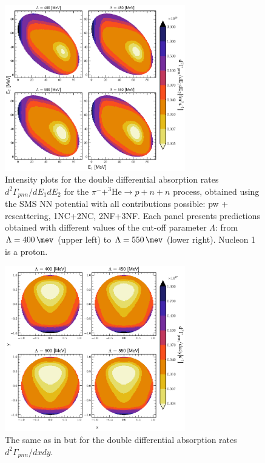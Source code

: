     
    
        \begin{figure}[h]
            \begin{center}
            \includegraphics[width=0.7\textwidth]{PlotData/PION/Dalitz_maps/figures/Dalitz_map_pnn_E1E2_cutofs.pdf}
            \end{center}
            \caption{Intensity plots for the double differential absorption rates
            $d^2 \Gamma_{pnn}/dE_1dE_2$ for the $\pi^- + ^3\text{He} \rightarrow p + n + n$ process, obtained using the SMS NN potential
            with all contributions possible: \gls{pw} + rescattering, 1NC+2NC, 2NF+3NF.
            Each panel presents predictions obtained with different values of the cut-off parameter $\Lambda$:
            from $\Lambda=\SI{400}{\mev}$ (upper left) to $\Lambda=\SI{550}{\mev}$ (lower right). Nucleon 1 is a proton.}
            \label{pion_map_E1E2_cutoff}
        \end{figure}

    \begin{figure}[h]
        \begin{center}
        \includegraphics[width=0.7\textwidth]{PlotData/PION/Dalitz_maps/figures/Dalitz_map_pnn_xy_cutofs.pdf}
        \end{center}
        \caption{The same as in  but for the double differential absorption rates
        $d^2 \Gamma_{pnn}/dxdy$.}
        \label{pion_map_xy_cutoff}
    \end{figure}

